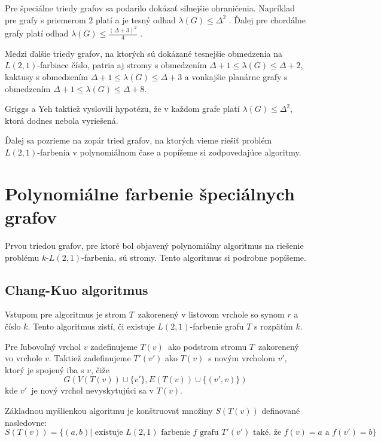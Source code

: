 Pre špeciálne triedy grafov sa podarilo dokázať silnejšie ohraničenia. Napríklad
pre grafy s priemerom $2$ platí a je tesný odhad $\lambda(G) \leq \Delta^2$\cite{griggs_yeh_tree}
. Ďalej pre chordálne grafy platí odhad $\lambda(G) \leq \frac{\left( \Delta + 3 \right)^2}{4}$\cite{griggs_yeh_tree}
.

Medzi ďalšie triedy grafov, na ktorých sú dokázané tesnejšie obmedzenia na $L(2,1)$-farbiace
číslo, patria aj stromy s obmedzením $\Delta + 1 \leq \lambda(G) \leq \Delta + 2$\cite{griggs_yeh_tree},
kaktusy s obmedzením $\Delta + 1 \leq \lambda(G) \leq \Delta + 3$\cite{kaktusy} a vonkajšie planárne
grafy s obmedzením $\Delta + 1 \leq \lambda(G) \leq \Delta + 8$\cite{outer_planar_bound}.

Griggs a Yeh taktiež vyslovili hypotézu, že v každom grafe platí $\lambda(G) \leq \Delta^2$,
ktorá dodnes nebola vyriešená.

Ďalej sa pozrieme na zopár tried grafov, na ktorých vieme riešiť problém $L(2,1)$-farbenia
v polynomiálnom čase a popíšeme si zodpovedajúce algoritmy.

\section{Polynomiálne farbenie špeciálnych grafov}

Prvou triedou grafov, pre ktoré bol objavený polynomiálny algoritmus na riešenie
problému $k$-$L(2,1)$-farbenia, sú stromy\cite{chang_kuo}. Tento algoritmus si
podrobne popíšeme.

\subsection{Chang-Kuo algoritmus}

Vstupom pre algoritmus je strom $T$ zakorenený v listovom vrchole so synom $r$ a číslo $k$.
Tento algoritmus zistí, či existuje $L(2,1)$-farbenie grafu $T$ s rozpätím $k$.

Pre ľubovoľný
vrchol $v$ zadefinujeme $T(v)$ ako podstrom stromu $T$ zakorenený vo vrchole $v$. Taktiež
zadefinujeme $T'(v')$ ako $T(v)$ s novým vrcholom $v'$, ktorý je spojený iba s $v$, čiže
$$ G\left(V(T(v)) \cup \{ v' \}, E(T(v)) \cup \{ (v', v)\} \right) $$
kde $v'$ je nový vrchol nevyskytujúci sa v $T(v)$.

Základnou myšlienkou algoritmu je konštruovať množiny $S(T(v))$ definované nasledovne:
$$S(T(v)) = \{ (a, b) | \textrm{ existuje } L(2,1) \textrm{ farbenie } f \textrm{ grafu } T'(v') \textrm{ také, že } f(v) = a \textrm{ a } f(v') = b\}$$

